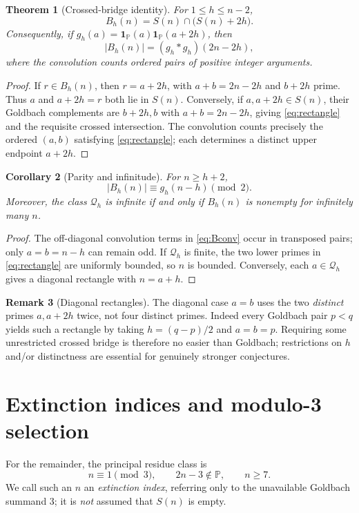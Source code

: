 \documentclass[11pt,a4paper]{article}
\newtheorem{theorem}{Theorem}[section]
\newtheorem{corollary}[theorem]{Corollary}
\theoremstyle{definition}
\newtheorem{remark}[theorem]{Remark}
\newcommand{\PP}{\mathbb P}
\newcommand{\one}{\mathbf 1}
\newcommand{\Qcal}{\mathcal Q}
\begin{document}
\begin{theorem}[Crossed-bridge identity]\label{thm:autocorr}
For $1\le h\le n-2$,
\begin{equation}\label{eq:autocorr}
 \boxed{B_h(n)=S(n)\cap\bigl(S(n)+2h\bigr)}.
\end{equation}
Consequently, if $g_h(a)=\one_{\PP}(a)\one_{\PP}(a+2h)$, then
\begin{equation}\label{eq:Bconv}
 \boxed{|B_h(n)|=(g_h*g_h)(2n-2h)},
\end{equation}
where the convolution counts ordered pairs of positive integer arguments.
\end{theorem}
\begin{proof}
If $r\in B_h(n)$, then $r=a+2h$, with $a+b=2n-2h$ and $b+2h$ prime. Thus $a$ and $a+2h=r$ both lie in $S(n)$. Conversely, if $a,a+2h\in S(n)$, their Goldbach complements are $b+2h,b$ with $a+b=2n-2h$, giving \eqref{eq:rectangle} and the requisite crossed intersection. The convolution counts precisely the ordered $(a,b)$ satisfying \eqref{eq:rectangle}; each determines a distinct upper endpoint $a+2h$.
\end{proof}

\begin{corollary}[Parity and infinitude]\label{cor:B-infinite}
For $n\ge h+2$,
\[
 |B_h(n)|\equiv g_h(n-h)\pmod2.
\]
Moreover, the class $\Qcal_h$ is infinite if and only if $B_h(n)$ is nonempty for infinitely many $n$.
\end{corollary}
\begin{proof}
The off-diagonal convolution terms in \eqref{eq:Bconv} occur in transposed pairs; only $a=b=n-h$ can remain odd. If $\Qcal_h$ is finite, the two lower primes in \eqref{eq:rectangle} are uniformly bounded, so $n$ is bounded. Conversely, each $a\in\Qcal_h$ gives a diagonal rectangle with $n=a+h$.
\end{proof}
\begin{remark}[Diagonal rectangles]
The diagonal case $a=b$ uses the two \emph{distinct} primes $a,a+2h$ twice, not four distinct primes. Indeed every Goldbach pair $p<q$ yields such a rectangle by taking $h=(q-p)/2$ and $a=b=p$. Requiring some unrestricted crossed bridge is therefore no easier than Goldbach; restrictions on $h$ and/or distinctness are essential for genuinely stronger conjectures.
\end{remark}

\section{Extinction indices and modulo-3 selection}
For the remainder, the principal residue class is
\begin{equation}\label{eq:extinction}
 n\equiv1\pmod3,\qquad 2n-3\notin\PP,\qquad n\ge7.
\end{equation}
We call such an $n$ an \emph{extinction index}, referring only to the unavailable Goldbach summand 3; it is \emph{not} assumed that $S(n)$ is empty.
\end{document}
